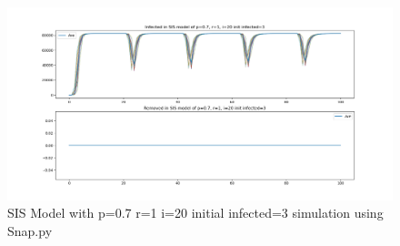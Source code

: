 \documentclass{subfile}
\begin{document}
  \begin{figure}
  \includegraphics[scale=0.8]{sisp07r1i20s3}
  \caption[SIS p=0.7,r=1,i=20,init infected=3]{SIS Model with p=0.7 r=1 i=20 initial infected=3 simulation using Snap.py}
  \end{figure}

  \clearpage
\end{document}
